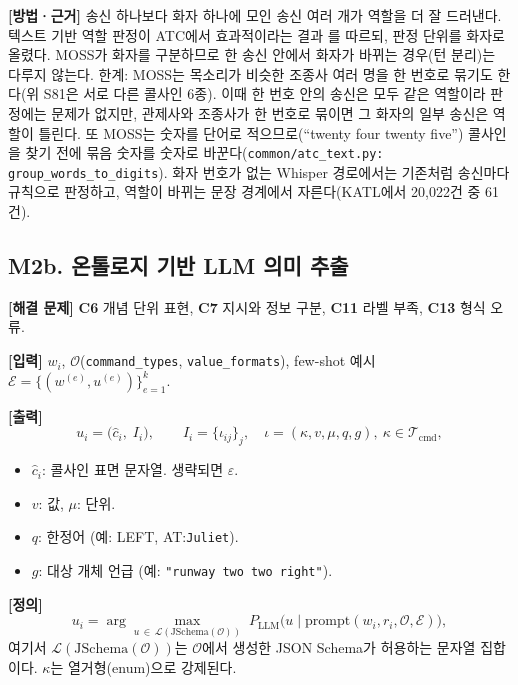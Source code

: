 \documentclass[10pt,a4paper]{article}
\newcommand{\Ont}{\mathcal{O}}
\newcommand{\Tcmd}{\mathcal{T}_{\mathrm{cmd}}}
\newcommand{\cmd}[1]{\textsf{\small #1}}
\newcommand{\ch}[1]{\textbf{\textcolor{red!60!black}{#1}}}
\begin{document}
\textbf{[방법·근거]} 송신 하나보다 화자 하나에 모인 송신 여러 개가 역할을 더 잘 드러낸다. 텍스트 기반 역할 판정이 ATC에서 효과적이라는 결과 \cite{bertraffic}를 따르되, 판정 단위를 화자로 올렸다. MOSS가 화자를 구분하므로 한 송신 안에서 화자가 바뀌는 경우(턴 분리)는 다루지 않는다. 한계: MOSS는 목소리가 비슷한 조종사 여러 명을 한 번호로 묶기도 한다(위 S81은 서로 다른 콜사인 6종). 이때 한 번호 안의 송신은 모두 같은 역할이라 판정에는 문제가 없지만, 관제사와 조종사가 한 번호로 묶이면 그 화자의 일부 송신은 역할이 틀린다. 또 MOSS는 숫자를 단어로 적으므로(``twenty four twenty five'') 콜사인을 찾기 전에 묶음 숫자를 숫자로 바꾼다(\texttt{common/atc\_text.py: group\_words\_to\_digits}). 화자 번호가 없는 Whisper 경로에서는 기존처럼 송신마다 규칙으로 판정하고, 역할이 바뀌는 문장 경계에서 자른다(KATL에서 20,022건 중 61건).

\subsection{M2b. 온톨로지 기반 LLM 의미 추출}
\textbf{[해결 문제]} \ch{C6} 개념 단위 표현, \ch{C7} 지시와 정보 구분, \ch{C11} 라벨 부족, \ch{C13} 형식 오류.

\textbf{[입력]} $w_i$, $\Ont$(\texttt{command\_types}, \texttt{value\_formats}), few-shot 예시 $\mathcal{E}=\{(w^{(e)},u^{(e)})\}_{e=1}^{k}$.

\textbf{[출력]}
\begin{equation}
u_i = \big(\hat c_i,\; I_i\big),\qquad I_i=\{\iota_{ij}\}_{j},\quad \iota=(\kappa, v, \mu, q, g),\ \kappa\in\Tcmd,
\end{equation}
\begin{itemize}
\item $\hat c_i$: 콜사인 표면 문자열. 생략되면 $\varepsilon$.
\item $v$: 값, $\mu$: 단위.
\item $q$: 한정어 (예: \cmd{LEFT}, \cmd{AT}:\texttt{Juliet}).
\item $g$: 대상 개체 언급 (예: \texttt{"runway two two right"}).
\end{itemize}

\textbf{[정의]}
\begin{equation}
u_i = \arg\max_{u\,\in\,\mathcal{L}(\mathrm{JSchema}(\Ont))}\; P_{\mathrm{LLM}}\big(u \mid \mathrm{prompt}(w_i, r_i, \Ont, \mathcal{E})\big),
\end{equation}
여기서 $\mathcal{L}(\mathrm{JSchema}(\Ont))$는 $\Ont$에서 생성한 JSON Schema가 허용하는 문자열 집합이다. $\kappa$는 열거형(enum)으로 강제된다.
\end{document}
